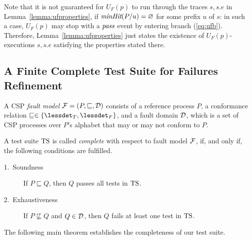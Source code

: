 %
Note that it is not guaranteed for $U_F(p)$ to run through the traces $s,
s.e$ in Lemma~\ref{lemma:ufproperties}, if $\text{\it minHit}(P/u) = \varnothing$ for
some prefix $u$ of $s$: in such a case, $U_F(p)$ may stop with a ${\text{\it pass}}$
event by entering branch (\ref{eq:ufb}). Therefore,
Lemma~\ref{lemma:ufproperties} just states the existence of
$U_F(p)$-executions $s, s.e$ satisfying the properties stated there.

\subsection{A Finite Complete Test Suite for Failures Refinement}

A CSP \emph{fault model} ${\cal F} = (P,\sqsubseteq,{\cal D})$ consists of a
reference process $P$, a conformance relation $\sqsubseteq \in \{\lessdet_T,
\lessdet_F\}$, and a fault domain ${\cal D}$, which is a set of CSP processes
over $P$'s alphabet that may or may not conform to $P$.

A test suite ${\text{TS}}$ is called \emph{complete} with respect to fault model
${\cal F}$, if, and only if, the following conditions are fulfilled.
\begin{description}
\item[1.~Soundness] If $P \sqsubseteq Q$, then $Q$ passes all tests in ${\text{TS}}$.
\item[2.~Exhaustiveness] If $P \not\sqsubseteq Q$ and $Q\in{\cal D}$,
then $Q$ fails at least one test in ${\text{TS}}$.
\end{description}
%
The following main theorem establishes the completeness of our test suite.

